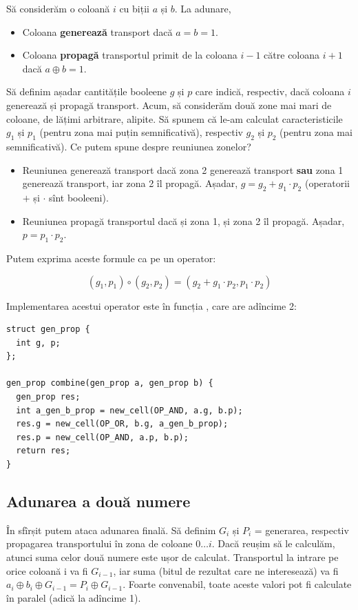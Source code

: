 \documentclass[../main.tex]{subfiles}
\begin{document}
Să considerăm o coloană $i$ cu biții $a$ și $b$. La adunare,

\begin{itemize}
  \item Coloana \textbf{generează} transport dacă $a = b = 1$.

  \item Coloana \textbf{propagă} transportul primit de la coloana $i-1$ către coloana $i+1$ dacă $a \oplus b = 1$.
\end{itemize}

Să definim așadar cantitățile booleene $g$ și $p$ care indică, respectiv, dacă coloana $i$ generează și propagă transport. Acum, să considerăm două zone mai mari de coloane, de lățimi arbitrare, alipite. Să spunem că le-am calculat caracteristicile $g_1$ și $p_1$ (pentru zona mai puțin semnificativă), respectiv $g_2$ și $p_2$ (pentru zona mai semnificativă). Ce putem spune despre reuniunea zonelor?

\begin{itemize}
  \item Reuniunea generează transport dacă zona 2 generează transport \textbf{sau} zona 1 generează transport, iar zona 2 îl propagă. Așadar, $g = g_2 + g_1 \cdot p_2$ (operatorii $+$ și $\cdot$ sînt booleeni).

  \item Reuniunea propagă transportul dacă și zona 1, și zona 2 îl propagă. Așadar, $p = p_1 \cdot p_2$.
\end{itemize}

Putem exprima aceste formule ca pe un operator:

$$(g_1, p_1) \circ (g_2, p_2) = (g_2 + g_1 \cdot p_2, p_1 \cdot p_2)$$

Implementarea acestui operator este în funcția , care are adîncime 2:

\begin{verbatim}
struct gen_prop {
  int g, p;
};

gen_prop combine(gen_prop a, gen_prop b) {
  gen_prop res;
  int a_gen_b_prop = new_cell(OP_AND, a.g, b.p);
  res.g = new_cell(OP_OR, b.g, a_gen_b_prop);
  res.p = new_cell(OP_AND, a.p, b.p);
  return res;
}
\end{verbatim}

\subsection{Adunarea a două numere}

În sfîrșit putem ataca adunarea finală. Să definim $G_i$ și $P_i$ = generarea, respectiv propagarea transportului în zona de coloane $0 \dots i$. Dacă reușim să le calculăm, atunci suma celor două numere este ușor de calculat. Transportul la intrare pe orice coloană i va fi $G_{i-1}$, iar suma (bitul de rezultat care ne interesează) va fi $a_i \oplus b_i \oplus G_{i-1} = P_i \oplus G_{i-1}$. Foarte convenabil, toate aceste valori pot fi calculate în paralel (adică la adîncime 1).
\end{document}
